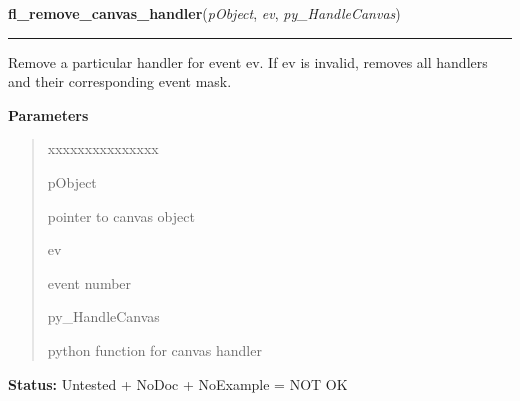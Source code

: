 \hspace{.8\funcindent}\begin{boxedminipage}{\funcwidth}

    \raggedright \textbf{fl\_remove\_canvas\_handler}(\textit{pObject}, \textit{ev}, \textit{py\_HandleCanvas})

    \vspace{-1.5ex}

    \rule{\textwidth}{0.5\fboxrule}
\setlength{\parskip}{2ex}
    Remove a particular handler for event ev. If ev is invalid, removes all
    handlers and their corresponding event mask.

\setlength{\parskip}{1ex}
      \textbf{Parameters}
      \vspace{-1ex}

      \begin{quote}
        \begin{Ventry}{xxxxxxxxxxxxxxx}

          \item[pObject]

          pointer to canvas object

          \item[ev]

          event number

          \item[py\_HandleCanvas]

          python function for canvas handler

        \end{Ventry}

      \end{quote}

\textbf{Status:} Untested + NoDoc + NoExample = NOT OK



    \end{boxedminipage}

    \label{xformslib:library:fl_hide_canvas}

    \vspace{0.5ex}

